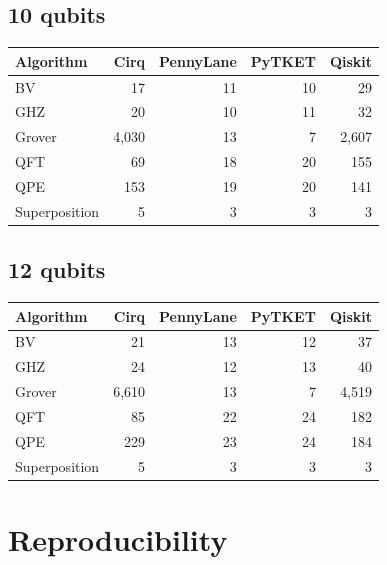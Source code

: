 \documentclass[11pt,a4paper]{article}
\begin{document}
\subsection{10 qubits}

\begin{table}[H]
\centering
\begin{tabular}{lrrrr}
\toprule
Algorithm & Cirq & PennyLane & PyTKET & Qiskit \\
\midrule
BV            & 17    & 11 & 10 & 29 \\
GHZ           & 20    & 10 & 11 & 32 \\
Grover        & 4{,}030 & 13 & 7  & 2{,}607 \\
QFT           & 69    & 18 & 20 & 155 \\
QPE           & 153   & 19 & 20 & 141 \\
Superposition & 5     & 3  & 3  & 3 \\
\bottomrule
\end{tabular}
\end{table}

\subsection{12 qubits}

\begin{table}[H]
\centering
\begin{tabular}{lrrrr}
\toprule
Algorithm & Cirq & PennyLane & PyTKET & Qiskit \\
\midrule
BV            & 21    & 13 & 12 & 37 \\
GHZ           & 24    & 12 & 13 & 40 \\
Grover        & 6{,}610 & 13 & 7  & 4{,}519 \\
QFT           & 85    & 22 & 24 & 182 \\
QPE           & 229   & 23 & 24 & 184 \\
Superposition & 5     & 3  & 3  & 3 \\
\bottomrule
\end{tabular}
\end{table}


\section{Reproducibility}
\end{document}

